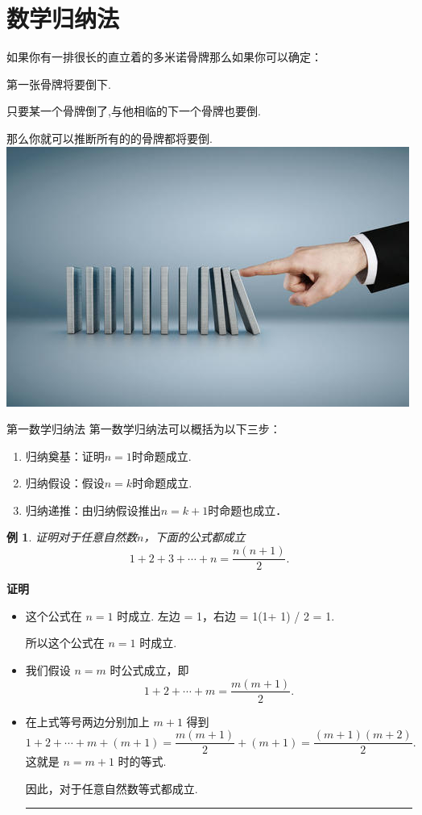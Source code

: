 \documentclass[13pt,fontset=mac]{ctexbeamer}
\newtheorem{exa}{例}
\def\qed{\nopagebreak\hfill{\rule{4pt}{7pt}}\medbreak}
\def\pf{{\bf 证明~~ }}
\begin{document}
\section{数学归纳法}

\begin{frame}


如果你有一排很长的直立着的多米诺骨牌那么如果你可以确定：

第一张骨牌将要倒下.

只要某一个骨牌倒了,与他相临的下一个骨牌也要倒.

那么你就可以推断所有的的骨牌都将要倒. \\[15pt]
		\includegraphics[scale=0.4]{gupai.jpg}
\end{frame}


\begin{frame}{第一数学归纳法}
第一数学归纳法可以概括为以下三步：
\begin{enumerate}

\item 归纳奠基：证明$n=1$时命题成立.
\item 归纳假设：假设$n=k$时命题成立.
\item 归纳递推：由归纳假设推出$n=k+1$时命题也成立．
\end{enumerate}
\end{frame}

\begin{frame}
\begin{exa}
证明对于任意自然数$n$，下面的公式都成立
\[
1+2+3+\cdots+n=\frac{n(n+1)}{2}.
\]
\end{exa}
\pause
\pf
\begin{itemize}
\item 这个公式在 $n=1$ 时成立.  左边 = 1，右边 = 1(1+ 1) / 2 = 1.

所以这个公式在 $n=1$ 时成立.
\item 我们假设 $n=m$ 时公式成立，即
\[
1+2+\cdots+m=\frac{m(m+1)}{2}.
\]
\item 在上式等号两边分别加上 $m+1$ 得到
\[
1+2+\cdots+m+(m+1)=\frac{m(m+1)}{2}+(m+1) = \frac{(m+1)(m+2)}{2}.
\]
这就是 $n=m+1$ 时的等式.

因此，对于任意自然数等式都成立. \qed
\end{itemize}
\end{frame}
\end{document}
